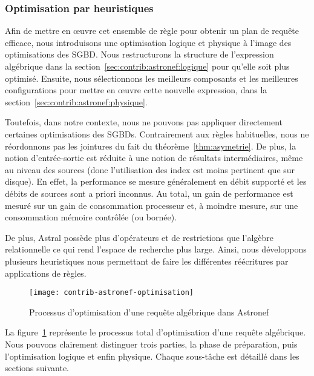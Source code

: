 \subsubsection{Optimisation par heuristiques}
Afin de mettre en œuvre cet ensemble de règle pour obtenir un plan de requête efficace, nous introduisons une optimisation logique et physique à l'image des optimisations des SGBD. Nous restructurons la structure de l'expression algébrique dans la section~\ref{sec:contrib:astronef:logique} pour qu'elle soit plus optimisé. Ensuite, nous sélectionnons les meilleurs composants et les meilleures configurations pour mettre en œuvre cette nouvelle expression, dans la section~\ref{sec:contrib:astronef:physique}.

Toutefois, dans notre contexte, nous ne pouvons pas appliquer directement certaines optimisations des SGBDs. Contrairement aux règles habituelles, nous ne réordonnons pas les jointures du fait du théorème~\ref{thm:asymetrie}. De plus, la notion d'entrée-sortie est réduite à une notion de résultats intermédiaires, même au niveau des sources (donc l'utilisation des index est moins pertinent que sur disque). En effet, la performance se mesure généralement en débit supporté et les débits de sources sont a priori inconnus. Au total, un gain de performance est mesuré sur un gain de consommation processeur et, à moindre mesure, sur une consommation mémoire contrôlée (ou bornée).

De plus, Astral possède plus d'opérateurs et de restrictions que l'algèbre relationnelle ce qui rend l'espace de recherche plus large. Ainsi, nous développons plusieurs heuristiques nous permettant de faire les différentes réécritures par applications de règles.

\begin{figure}[ht]
	\centering
	\texttt{[image: contrib-astronef-optimisation]}
	\caption{Processus d'optimisation d'une requête algébrique dans Astronef}\label{fig:contrib:astronef:optimisation}
\end{figure}
La figure~\ref{fig:contrib:astronef:optimisation} représente le processus total d'optimisation d'une requête algébrique. Nous pouvons clairement distinguer trois parties, la phase de préparation, puis l'optimisation logique et enfin physique. Chaque sous-tâche est détaillé dans les sections suivante.

